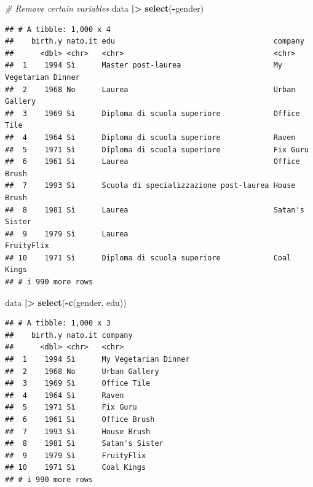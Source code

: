 \documentclass[
]{book}
\newenvironment{Shaded}{\begin{snugshade}}{\end{snugshade}}
\newcommand{\CommentTok}[1]{\textcolor[rgb]{0.56,0.35,0.01}{\textit{#1}}}
\newcommand{\FunctionTok}[1]{\textcolor[rgb]{0.13,0.29,0.53}{\textbf{#1}}}
\newcommand{\NormalTok}[1]{#1}
\newcommand{\SpecialCharTok}[1]{\textcolor[rgb]{0.81,0.36,0.00}{\textbf{#1}}}
\begin{document}
\begin{Shaded}
\begin{Highlighting}[]
\CommentTok{\# Remove certain variables}
\NormalTok{data }\SpecialCharTok{|\textgreater{}} 
  \FunctionTok{select}\NormalTok{(}\SpecialCharTok{{-}}\NormalTok{gender)}
\end{Highlighting}
\end{Shaded}

\begin{verbatim}
## # A tibble: 1,000 x 4
##    birth.y nato.it edu                                    company             
##      <dbl> <chr>   <chr>                                  <chr>               
##  1    1994 Sì      Master post-laurea                     My Vegetarian Dinner
##  2    1968 No      Laurea                                 Urban Gallery       
##  3    1969 Sì      Diploma di scuola superiore            Office Tile         
##  4    1964 Sì      Diploma di scuola superiore            Raven               
##  5    1971 Sì      Diploma di scuola superiore            Fix Guru            
##  6    1961 Sì      Laurea                                 Office Brush        
##  7    1993 Sì      Scuola di specializzazione post-laurea House Brush         
##  8    1981 Sì      Laurea                                 Satan's Sister      
##  9    1979 Sì      Laurea                                 FruityFlix          
## 10    1971 Sì      Diploma di scuola superiore            Coal Kings          
## # i 990 more rows
\end{verbatim}

\begin{Shaded}
\begin{Highlighting}[]
\NormalTok{data }\SpecialCharTok{|\textgreater{}} 
  \FunctionTok{select}\NormalTok{(}\SpecialCharTok{{-}}\FunctionTok{c}\NormalTok{(gender, edu))}
\end{Highlighting}
\end{Shaded}

\begin{verbatim}
## # A tibble: 1,000 x 3
##    birth.y nato.it company             
##      <dbl> <chr>   <chr>               
##  1    1994 Sì      My Vegetarian Dinner
##  2    1968 No      Urban Gallery       
##  3    1969 Sì      Office Tile         
##  4    1964 Sì      Raven               
##  5    1971 Sì      Fix Guru            
##  6    1961 Sì      Office Brush        
##  7    1993 Sì      House Brush         
##  8    1981 Sì      Satan's Sister      
##  9    1979 Sì      FruityFlix          
## 10    1971 Sì      Coal Kings          
## # i 990 more rows
\end{verbatim}
\end{document}
